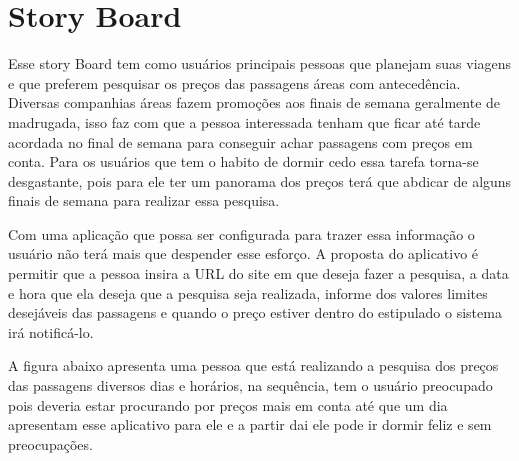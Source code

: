 \chapter[Story Board]{Story Board}

Esse story Board tem como  usuários principais pessoas que planejam suas viagens e que preferem pesquisar os preços das passagens áreas com antecedência. Diversas companhias áreas fazem promoções aos finais de semana geralmente de madrugada, isso faz com que a pessoa interessada tenham que ficar até tarde acordada no final de semana para conseguir achar passagens com preços em conta. Para os usuários que tem o habito de dormir cedo essa tarefa torna-se desgastante, pois para ele ter um panorama dos preços terá que abdicar de alguns finais de semana para realizar essa pesquisa. 

Com uma aplicação que possa ser configurada para trazer essa informação o usuário não terá mais que  despender esse esforço. A proposta do aplicativo é permitir que a pessoa insira a URL do site em que deseja fazer a pesquisa, a data e hora que ela deseja que a pesquisa seja realizada, informe dos valores limites desejáveis das passagens e quando o preço estiver dentro do estipulado o sistema irá notificá-lo. 

A figura abaixo apresenta uma pessoa que está realizando a pesquisa dos preços das passagens diversos  dias e horários, na sequência, tem o usuário preocupado pois deveria estar procurando por preços mais em conta até que um dia apresentam esse aplicativo para ele e a partir dai ele pode ir dormir feliz e sem preocupações.



